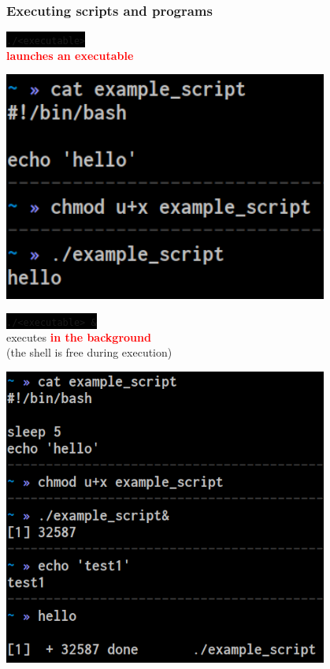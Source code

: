\documentclass[unknownkeysallowed, 10pt, a4 paper, handout]{beamer}
\newcommand{\focus}[1]{\textbf{\textcolor{red}{#1}}}
\newcommand{\code}[1]{\colorbox{black}{\color{green}\texttt{#1}}}
\newcommand{\sidebyside}[5]{
  \begin{minipage}{#1\textwidth}
    #2
  \end{minipage} #3 \begin{minipage}{#4\textwidth}
    #5
  \end{minipage}
}
\begin{document}
\begin{frame}
  \begin{center}
    \frametitle{Executing scripts and programs}

    \sidebyside{0.45}{
      \centering
      \code{./<executable>}\\
      \focus{launches an executable}
    }{\hfill}{0.50}{
      \begin{center}
        \includegraphics[width=0.80\textwidth]{pics/execute.png}
      \end{center}
    }

   \sidebyside{0.48}{
      \centering
      \code{./<executable> \&}\\
      executes \focus{in the background}\\
      (the shell is free during execution)
    }{\hfill}{0.50}{
      \begin{center}
        \includegraphics[width=0.80\textwidth]{pics/background.png}
      \end{center}
    }
  \end{center}
\end{frame}
\end{document}
